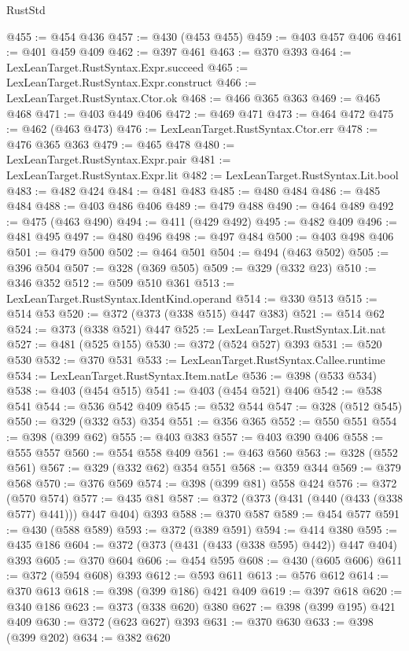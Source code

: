 \begin{lexlean}{RustStd}
\begin{coremodule}
@455 := @454 @436
@457 := @430 (@453 @455)
@459 := @403 @457 @406
@461 := @401 @459 @409
@462 := @397 @461
@463 := @370 @393
@464 := LexLeanTarget.RustSyntax.Expr.succeed
@465 := LexLeanTarget.RustSyntax.Expr.construct
@466 := LexLeanTarget.RustSyntax.Ctor.ok
@468 := @466 @365 @363
@469 := @465 @468
@471 := @403 @449 @406
@472 := @469 @471
@473 := @464 @472
@475 := @462 (@463 @473)
@476 := LexLeanTarget.RustSyntax.Ctor.err
@478 := @476 @365 @363
@479 := @465 @478
@480 := LexLeanTarget.RustSyntax.Expr.pair
@481 := LexLeanTarget.RustSyntax.Expr.lit
@482 := LexLeanTarget.RustSyntax.Lit.bool
@483 := @482 @424
@484 := @481 @483
@485 := @480 @484
@486 := @485 @484
@488 := @403 @486 @406
@489 := @479 @488
@490 := @464 @489
@492 := @475 (@463 @490)
@494 := @411 (@429 @492)
@495 := @482 @409
@496 := @481 @495
@497 := @480 @496
@498 := @497 @484
@500 := @403 @498 @406
@501 := @479 @500
@502 := @464 @501
@504 := @494 (@463 @502)
@505 := @396 @504
@507 := @328 (@369 @505)
@509 := @329 (@332 @23)
@510 := @346 @352
@512 := @509 @510 @361
@513 := LexLeanTarget.RustSyntax.IdentKind.operand
@514 := @330 @513
@515 := @514 @53
@520 := @372 (@373 (@338 @515) @447 @383)
@521 := @514 @62
@524 := @373 (@338 @521) @447
@525 := LexLeanTarget.RustSyntax.Lit.nat
@527 := @481 (@525 @155)
@530 := @372 (@524 @527) @393
@531 := @520 @530
@532 := @370 @531
@533 := LexLeanTarget.RustSyntax.Callee.runtime
@534 := LexLeanTarget.RustSyntax.Item.natLe
@536 := @398 (@533 @534)
@538 := @403 (@454 @515)
@541 := @403 (@454 @521) @406
@542 := @538 @541
@544 := @536 @542 @409
@545 := @532 @544
@547 := @328 (@512 @545)
@550 := @329 (@332 @53) @354
@551 := @356 @365
@552 := @550 @551
@554 := @398 (@399 @62)
@555 := @403 @383
@557 := @403 @390 @406
@558 := @555 @557
@560 := @554 @558 @409
@561 := @463 @560
@563 := @328 (@552 @561)
@567 := @329 (@332 @62) @354 @551
@568 := @359 @344
@569 := @379 @568
@570 := @376 @569
@574 := @398 (@399 @81) @558 @424
@576 := @372 (@570 @574)
@577 := @435 @81
@587 := @372 (@373 (@431 (@440 (@433 (@338 @577) @441))) @447 @404) @393
@588 := @370 @587
@589 := @454 @577
@591 := @430 (@588 @589)
@593 := @372 (@389 @591)
@594 := @414 @380
@595 := @435 @186
@604 := @372 (@373 (@431 (@433 (@338 @595) @442)) @447 @404) @393
@605 := @370 @604
@606 := @454 @595
@608 := @430 (@605 @606)
@611 := @372 (@594 @608) @393
@612 := @593 @611
@613 := @576 @612
@614 := @370 @613
@618 := @398 (@399 @186) @421 @409
@619 := @397 @618
@620 := @340 @186
@623 := @373 (@338 @620) @380
@627 := @398 (@399 @195) @421 @409
@630 := @372 (@623 @627) @393
@631 := @370 @630
@633 := @398 (@399 @202)
@634 := @382 @620

\end{coremodule}
\end{lexlean}
